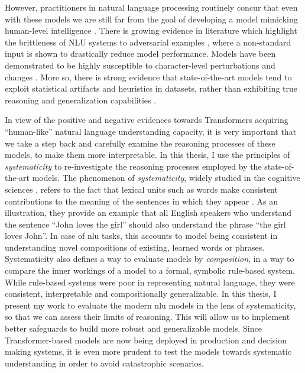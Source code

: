 \documentclass[letterpaper, 12pt]{report}
\begin{document}
However, practitioners in natural language processing routinely concur that even with these models we are still far from the goal of developing a model mimicking human-level intelligence \citep{kiela-etal-2021-dynabench}. There is growing evidence in literature which highlight the brittleness of NLU systems to adversarial examples \citep{jia-liang-2017-adversarial,ettinger-etal-2017-towards,ettinger-2020-whatbertisnot,ribeiro-etal-2020-beyond}, where a non-standard input is shown to drastically reduce model performance. Models have been demonstrated to be highly susceptible to character-level perturbations and changes \citep{ebrahimi-etal-2018-adversarial,minervini-riedel-2018-adversarially,ebrahimi-etal-2018-hotflip,wallace-etal-2019-universal}.
More so, there is strong evidence that state-of-the-art models tend to exploit statistical artifacts and heuristics in datasets, rather than exhibiting true reasoning and generalization capabilities \citep{gururangan-etal-2018-annotation,poliak-etal-2018-hypothesis,tsuchiya-2018-performance,naik-etal-2018-stress,mccoy2019}.

In view of the positive and negative evidences towards Transformers acquiring ``human-like'' natural language understanding capacity, it is very important that we take a step back and carefully examine the reasoning processes of these models, to make them more interpretable. In this thesis, I use the principles of \textit{systematicity} to re-investigate the reasoning processes employed by the state-of-the-art models.
The phenomenon of \textit{systematicity}, widely studied in the cognitive sciences \citep{gentner1986systematicity}, refers to the fact that lexical units such as words make consistent contributions to the meaning of the sentences in which they appear \citep{fodor1988connectionism}. As an illustration, they provide an example that all English speakers who understand the sentence ``John loves the girl'' should also understand the phrase ``the girl loves John''. In case of \acrshort{nlu} tasks, this accounts to model being consistent in understanding novel compositions of existing, learned words or phrases. Systematicity also defines a way to evaluate models by \textit{composition}, in a way to compare the inner workings of a model to a formal, symbolic rule-based system. While rule-based systems were poor in representing natural language, they were consistent, interpretable and compositionally generalizable. In this thesis, I present my work to evaluate the modern \acrshort{nlu} models in the lens of systematicity, so that we can assess their limits of reasoning. This will allow us to implement better safeguards to build more robust and generalizable models. Since Transformer-based models are now being deployed in production and decision making systems, it is even more prudent to test the models towards systematic understanding in order to avoid catastrophic scenarios.
\end{document}
